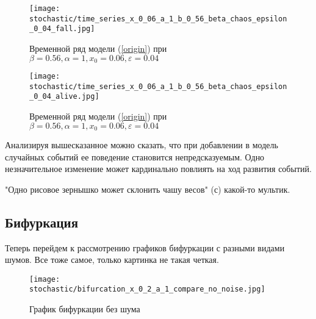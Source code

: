 
        \begin{figure}
            \centering
            \texttt{[image: stochastic/time\_series\_x\_0\_06\_a\_1\_b\_0\_56\_beta\_chaos\_epsilon\_0\_04\_fall.jpg]}
        
            \captionsetup{justification=centering}
            \caption{Временной ряд модели (\ref{origin}) при \(\beta = 0.56, \alpha = 1, x_0 = 0.06, \varepsilon = 0.04\)}
            \label{time_series_x_0_06_a_1_b_0_56_beta_chaos_epsilon_0_04_fall}
        \end{figure}

        \begin{figure}
            \centering
            \texttt{[image: stochastic/time\_series\_x\_0\_06\_a\_1\_b\_0\_56\_beta\_chaos\_epsilon\_0\_04\_alive.jpg]}
        
            \captionsetup{justification=centering}
            \caption{Временной ряд модели (\ref{origin}) при \(\beta = 0.56, \alpha = 1, x_0 = 0.06, \varepsilon = 0.04\)}
            \label{time_series_x_0_06_a_1_b_0_56_beta_chaos_epsilon_0_04_alive}
        \end{figure}

        Анализируя вышесказанное можно сказать, что при добавлении в модель случайных событий ее поведение становится непредсказуемым. Одно незначительное изменение может кардинально повлиять на ход развития событий. 

        "Одно рисовое зернышко может склонить чашу весов" (с) какой-то мультик.


    \subsection{Бифуркация}

        Теперь перейдем к рассмотрению графиков бифуркации с разными видами шумов. Все тоже самое, только картинка не такая четкая.

        \begin{figure}
            \centering
            \texttt{[image: stochastic/bifurcation\_x\_0\_2\_a\_1\_compare\_no\_noise.jpg]}
        
            \captionsetup{justification=centering}
            \caption{График бифуркации без шума}
            \label{bifurcation_x_0_2_a_1_compare_no_noise}
        \end{figure}

